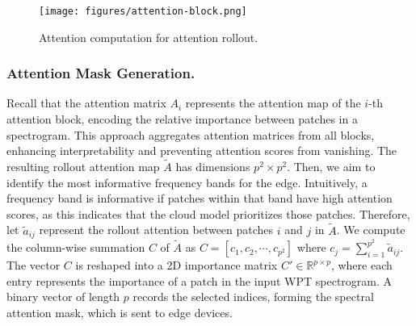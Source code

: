 \begin{figure}[tp]
    \centering
    \texttt{[image: figures/attention-block.png]}
    \vspace{-0.3cm}
    \caption{Attention computation for attention rollout.}
    \label{fig:attention-block}
    \vspace{-0.3cm}
\end{figure}


\noindent
\subsubsection{Attention Mask Generation.}
Recall that the attention matrix $A_i$ represents the attention map of the $i$-th attention block, encoding the relative importance between patches in a spectrogram. 
 This approach aggregates attention matrices from all blocks, enhancing interpretability and preventing attention scores from vanishing. 
The resulting rollout attention map $\widetilde{A}$ has dimensions $p^2 \times p^2$. 
Then, we aim to identify the most informative frequency bands for the edge. Intuitively, a frequency band is informative if patches within that band have high attention scores, as this indicates that the cloud model prioritizes those patches. Therefore, let $\widetilde{a}_{ij}$ represent the rollout attention between patches $i$ and $j$ in $\widetilde{A}$. We compute the column-wise summation $C$ of $\widetilde{A}$ as $C = [c_1, c_2, \cdots, c_{p^2}]$ where $c_j = \sum_{i=1}^{p^2} \widetilde{a}_{ij}$. 
The vector $C$ is reshaped into a 2D importance matrix $C'\in \mathbb{R}^{p \times p}$, where each entry represents the importance of a patch in the input WPT spectrogram. 
 A binary vector of length $p$ records the selected indices, forming the spectral attention mask, which is sent to edge devices.

\noindent
